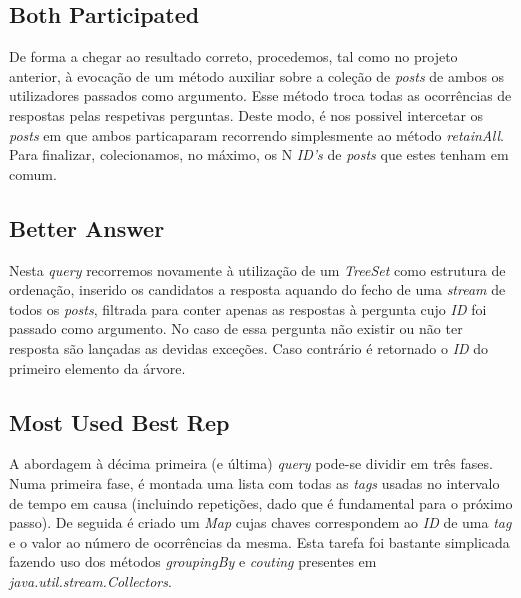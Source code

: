 \documentclass[a4paper, 11pt, oneside]{article}
\begin{document}
\subsection{Both Participated}

De forma a chegar ao resultado correto, procedemos, tal como no projeto anterior, à evocação de um método auxiliar sobre a coleção de \textit{posts} de ambos os utilizadores passados como argumento. Esse método troca todas as ocorrências de respostas pelas respetivas perguntas. Deste modo, é nos possivel intercetar os \textit{posts} em que ambos particaparam recorrendo simplesmente ao método \textit{retainAll}. Para finalizar, colecionamos, no máximo, os N \textit{ID's} de \textit{posts} que estes tenham em comum.

\subsection{Better Answer}

Nesta \textit{query} recorremos novamente à utilização de um \textit{TreeSet} como estrutura de ordenação, inserido os candidatos a resposta aquando do fecho de uma \textit{stream} de todos os \textit{posts}, filtrada para conter apenas as respostas à pergunta cujo \textit{ID} foi passado como argumento. No caso de essa pergunta não existir ou não ter resposta são lançadas as devidas exceções. Caso contrário é retornado o \textit{ID} do primeiro elemento da árvore.



\subsection{Most Used Best Rep}

A abordagem à décima primeira (e última) \textit{query} pode-se dividir em três fases. Numa primeira fase, é montada uma lista com todas as \textit{tags} usadas no intervalo de tempo em causa (incluindo repetições, dado que é fundamental para o próximo passo). De seguida é criado um \textit{Map} cujas chaves correspondem ao \textit{ID} de uma \textit{tag} e o valor ao número de ocorrências da mesma. Esta tarefa foi bastante simplicada fazendo uso dos métodos \textit{groupingBy} e \textit{couting} presentes em  \textit{java.util.stream.Collectors}. 






\end{document}
